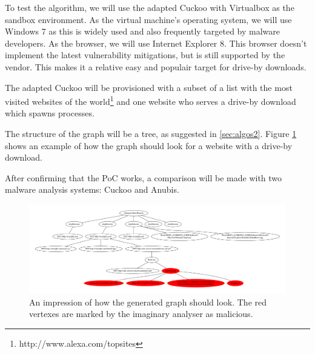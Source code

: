To test the algorithm, we will use the adapted Cuckoo with Virtualbox as the sandbox environment. As the virtual machine's operating system, we will use Windows 7 as this is widely used and also frequently targeted by malware developers. As the browser, we will use Internet Explorer 8. This browser doesn't implement the latest vulnerability mitigations, but is still supported by the vendor. This makes it a relative easy and populair target for drive-by downloads.

\pagebreak

The adapted Cuckoo will be provisioned with a subset of a list with the most visited websites of the world\footnote{http://www.alexa.com/topsites} and one website who serves a drive-by download which spawns processes.

The structure of the graph will be a tree, as suggested in \ref{sec:algos2}. Figure \ref{fig:alg_tree} shows an example of how the graph should look for a website with a drive-by download.

After confirming that the PoC works, a comparison will be made with two malware analysis systems: Cuckoo and Anubis.

\pagebreak

\begin{figure}[h]
    \centering
    \centerline{\includegraphics[width=25cm,angle=90]{Images/alg_tree}}
    \caption{An impression of how the generated graph should look. The red vertexes are marked by the imaginary analyser as malicious.}
    \label{fig:alg_tree}
\end{figure}

\pagebreak

\restoregeometry
{}
\setcounter{page}{\thesavepage}

